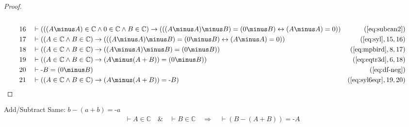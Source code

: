 \begin{proof}
\begin{align}
  \\ 16 &&  & \vdash ( ( ( A \minus A ) \in \mathbb{C} \wedge 0 \in \mathbb{C} \wedge B \in \mathbb{C} ) \rightarrow ( ( ( A \minus A ) \minus B ) = ( 0 \minus B ) \leftrightarrow ( A \minus A ) = 0 ) )&(\mbox{\ref{eq:subcan2}})\notag
  \\ 17 &&  & \vdash ( ( A \in \mathbb{C} \wedge B \in \mathbb{C} ) \rightarrow ( ( ( A \minus A ) \minus B ) = ( 0 \minus B ) \leftrightarrow ( A \minus A ) = 0 ) )&(\mbox{\ref{eq:syl}},15,16)\notag
  \\ 18 &&  & \vdash ( ( A \in \mathbb{C} \wedge B \in \mathbb{C} ) \rightarrow ( ( A \minus A ) \minus B ) = ( 0 \minus B ) )&(\mbox{\ref{eq:mpbird}},8,17)\notag
  \\ 19 &&  & \vdash ( ( A \in \mathbb{C} \wedge B \in \mathbb{C} ) \rightarrow ( A \minus ( A + B ) ) = ( 0 \minus B ) )&(\mbox{\ref{eq:eqtr3d}},6,18)\notag
  \\ 20 &&  & \vdash \textrm{-} B = ( 0 \minus B )&(\mbox{\ref{eq:df-neg}})\notag
  \\ 21 &&  & \vdash ( ( A \in \mathbb{C} \wedge B \in \mathbb{C} ) \rightarrow ( A \minus ( A + B ) ) = \textrm{-} B )&(\mbox{\ref{eq:syl6eqr}},19,20)\notag
\end{align}
\end{proof}

\begin{lemma} Add/Subtract Same: $b \minus ( a + b )
= \textrm{-} a$
\begin{align}
\vdash A \in \mathbb{C}\quad\&\quad \vdash B \in
    \mathbb{C}\quad\Rightarrow\quad \vdash ( B \minus ( A + B ) ) = \textrm{-}
    A\label{eq:bl.npucan2i}\tag{bl.npucan2i}
\end{align}
\end{lemma}

